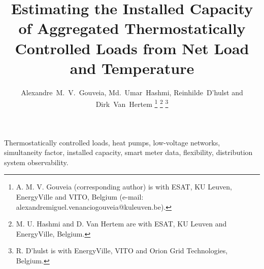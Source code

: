 \documentclass[9pt,journal,a4]{IEEEtran}
\begin{document}
\title{Estimating the Installed Capacity of Aggregated Thermostatically Controlled Loads from Net Load and Temperature}

\author{Alexandre~M.~V.~Gouveia, Md.~Umar~Hashmi, Reinhilde~D'hulst and Dirk~Van~Hertem%
\thanks{A. M. V. Gouveia (corresponding author) is with ESAT, KU Leuven, EnergyVille and VITO, Belgium (e-mail: alexandremiguel.venanciogouveia@kuleuven.be).}%
\thanks{M. U. Hashmi and D. Van Hertem are with ESAT, KU Leuven and EnergyVille, Belgium.}%
\thanks{R. D'hulst is with EnergyVille, VITO and Orion Grid Technologies, Belgium.}}

\maketitle

\begin{abstract}

\end{abstract}

\begin{IEEEkeywords}
Thermostatically controlled loads, heat pumps, low-voltage networks, simultaneity factor, installed capacity, smart meter data, flexibility, distribution system observability.
\end{IEEEkeywords}




\balance

{\let\footnotesize\scriptsize
}
\end{document}
